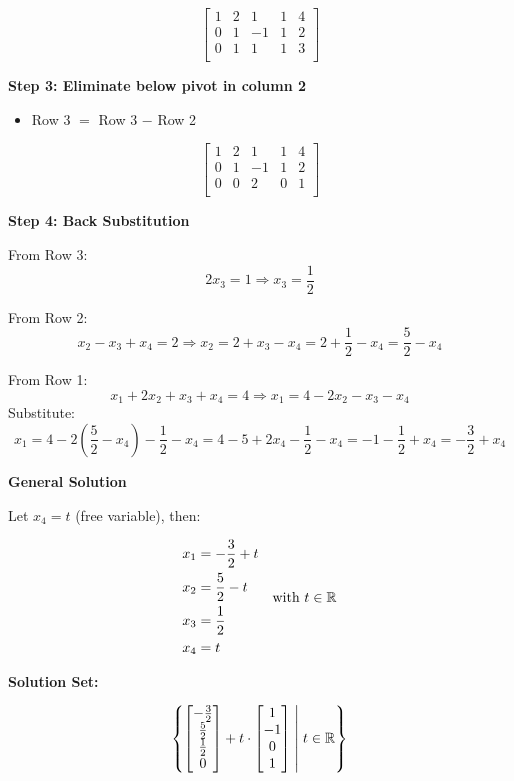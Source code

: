 \[
	\begin{bmatrix}
		1 & 2 & 1  & 1 & 4 \\
		0 & 1 & -1 & 1 & 2 \\
		0 & 1 & 1  & 1 & 3 \\
	\end{bmatrix}
\]

\textbf{Step 3: Eliminate below pivot in column 2}

\begin{itemize}
	\item Row 3 \(=\) Row 3 \(-\) Row 2
\end{itemize}

\[
	\begin{bmatrix}
		1 & 2 & 1  & 1 & 4 \\
		0 & 1 & -1 & 1 & 2 \\
		0 & 0 & 2  & 0 & 1 \\
	\end{bmatrix}
\]

\textbf{Step 4: Back Substitution}

From Row 3:
\[
	2x_3 = 1 \Rightarrow x_3 = \frac{1}{2}
\]

From Row 2:
\[
	x_2 - x_3 + x_4 = 2 \Rightarrow x_2 = 2 + x_3 - x_4 = 2 + \frac{1}{2} - x_4 = \frac{5}{2} - x_4
\]

From Row 1:
\[
	x_1 + 2x_2 + x_3 + x_4 = 4
	\Rightarrow x_1 = 4 - 2x_2 - x_3 - x_4
\]
Substitute:
\[
	x_1 = 4 - 2\left( \frac{5}{2} - x_4 \right) - \frac{1}{2} - x_4
	= 4 - 5 + 2x_4 - \frac{1}{2} - x_4
	= -1 - \frac{1}{2} + x_4 = -\frac{3}{2} + x_4
\]

\textbf{General Solution}

Let \(x_4 = t\) (free variable), then:

\[
	\begin{aligned}
		x_1 & = -\frac{3}{2} + t \\
		x_2 & = \frac{5}{2} - t  \\
		x_3 & = \frac{1}{2}      \\
		x_4 & = t
	\end{aligned}
	\quad \text{with } t \in \mathbb{R}
\]

\textbf{Solution Set:}

\[
	\left\{
	\begin{bmatrix}
		-\frac{3}{2} \\ \frac{5}{2} \\ \frac{1}{2} \\ 0
	\end{bmatrix}
	+ t \cdot
	\begin{bmatrix}
		1 \\ -1 \\ 0 \\ 1
	\end{bmatrix}
	\;\middle|\; t \in \mathbb{R}
	\right\}
\]

